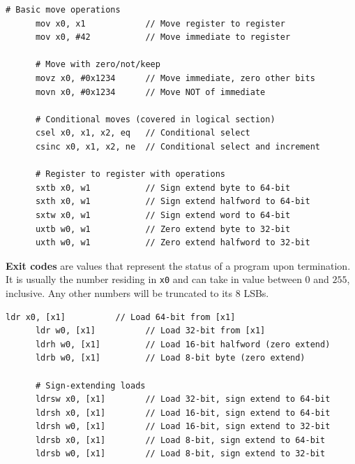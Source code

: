   \begin{definition}
    \label{def:data-movement-operations}
    \begin{lstlisting}[language=arm]
      # Basic move operations
      mov x0, x1            // Move register to register
      mov x0, #42           // Move immediate to register
      
      # Move with zero/not/keep
      movz x0, #0x1234      // Move immediate, zero other bits
      movn x0, #0x1234      // Move NOT of immediate
      
      # Conditional moves (covered in logical section)
      csel x0, x1, x2, eq   // Conditional select
      csinc x0, x1, x2, ne  // Conditional select and increment
      
      # Register to register with operations
      sxtb x0, w1           // Sign extend byte to 64-bit
      sxth x0, w1           // Sign extend halfword to 64-bit
      sxtw x0, w1           // Sign extend word to 64-bit
      uxtb w0, w1           // Zero extend byte to 32-bit
      uxth w0, w1           // Zero extend halfword to 32-bit
    \end{lstlisting}
  \end{definition} 

  \begin{definition}
    \label{def:exit-codes}
    \textbf{Exit codes} are values that represent the status of a program upon termination. It is usually the number residing in \texttt{x0} and can take in value between $0$ and $255$, inclusive. Any other numbers will be truncated to its 8 LSBs. 
  \end{definition}

  \begin{definition}
    \label{def:basic-load-operations}
    \begin{lstlisting}[language=arm]
      ldr x0, [x1]          // Load 64-bit from [x1]
      ldr w0, [x1]          // Load 32-bit from [x1]
      ldrh w0, [x1]         // Load 16-bit halfword (zero extend)
      ldrb w0, [x1]         // Load 8-bit byte (zero extend)
      
      # Sign-extending loads
      ldrsw x0, [x1]        // Load 32-bit, sign extend to 64-bit
      ldrsh x0, [x1]        // Load 16-bit, sign extend to 64-bit
      ldrsh w0, [x1]        // Load 16-bit, sign extend to 32-bit
      ldrsb x0, [x1]        // Load 8-bit, sign extend to 64-bit
      ldrsb w0, [x1]        // Load 8-bit, sign extend to 32-bit
    \end{lstlisting}
  \end{definition}

